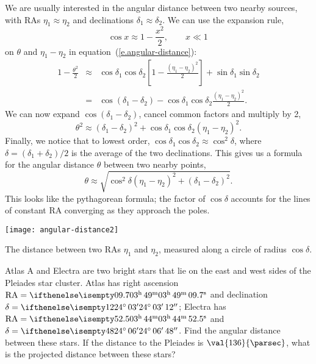 We are usually interested in the angular distance between two nearby sources, with RAs $\eta_{1} \approx \eta_{2}$ and declinations $\delta_{1}\approx\delta_{2}$.  We can use the expansion rule,
\[ \cos x \approx 1 - \frac{x^{2}}{2},\qquad x \ll 1 \, \]
on $\theta$ and $\eta_{1}-\eta_{2}$ in equation~(\ref{e.angular-distance}):
\begin{eqnarray*}
	1-\frac{\theta^{2}}{2} &\approx& \cos\delta_{1}\cos\delta_{2} \left[1-\frac{(\eta_{1}-\eta_{2})^{2}}{2}\right] + \sin\delta_{1}\sin\delta_{2}\\
		&=& \cos(\delta_{1}-\delta_{2}) - \cos\delta_{1}\cos\delta_{2}\frac{(\eta_{1}-\eta_{2})^{2}}{2}.
\end{eqnarray*}
We can now expand $\cos(\delta_{1}-\delta_{2})$, cancel common factors and multiply by 2,
\[ \theta^{2} \approx (\delta_{1}-\delta_{2})^{2} + \cos\delta_{1}\cos\delta_{2}(\eta_{1} - \eta_{2})^{2}. \]
Finally, we notice that to lowest order, $\cos\delta_{1}\cos\delta_{2}\approx \cos^{2}\delta$, where $\delta = (\delta_{1}+\delta_{2})/2$ is the average of the two declinations.  This gives us a formula for the angular distance $\theta$ between two nearby points,
\begin{equation}
\theta \approx \sqrt{\cos^{2}\delta\left(\eta_{1}-\eta_{2}\right)^{2} + \left(\delta_{1}-\delta_{2}\right)^{2}}.
\end{equation}
This looks like the pythagorean formula; the factor of $\cos\delta$ accounts for the lines of constant RA converging as they approach the poles.

\begin{marginfigure}[12\baselineskip]
\texttt{[image: angular-distance2]}
\caption[Angular distance between lines of constant right ascension]{The distance between two RAs $\eta_{1}$ and $\eta_{2}$, measured along a circle of radius $\cos\delta$.}
\label{f.angular-pythagorean}
\end{marginfigure}

\begin{exercisebox}
Atlas A and Electra are two bright stars that lie on the east and west sides of the Pleiades star cluster.  Atlas has right ascension $\RA = \hrangle{03}{49}{09.7}$ and declination $\delta = \dec{24}{03}{12}$; Electra has $\RA = \hrangle{03}{44}{52.5}$ and $\delta = \dec{24}{06}{48}$.  Find the angular distance between these stars.  If the distance to the Pleiades is $\val{136}{\parsec}$, what is the projected distance between these stars?
\end{exercisebox}

